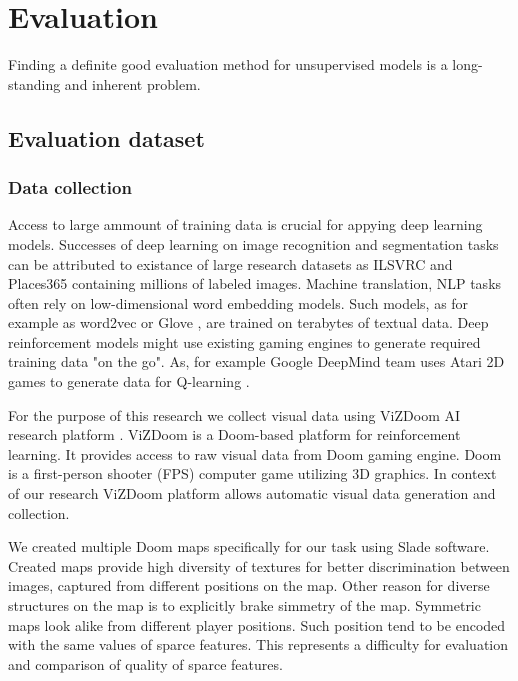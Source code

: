 
\chapter{Evaluation}
\label{ch:eval}

Finding a definite good evaluation method for unsupervised models is a long-standing and inherent problem.


\section{Evaluation dataset}
\subsection{Data collection}

Access to large ammount of training data is crucial for appying deep learning models.
Successes of deep learning on image recognition and segmentation tasks can be attributed to existance of large research datasets as ILSVRC and Places365 \cite{ILSVRC15, Zhou2016} containing millions of labeled images.
Machine translation, NLP tasks \cite{Karpathy2014, Kim2014} often rely on low-dimensional word embedding models.
Such models, as for example as word2vec or Glove \cite{Mikolov2013, pennington2014glove}, are trained on terabytes of textual data.
Deep reinforcement models might use existing gaming engines to generate required training data "on the go".
As, for example Google DeepMind team uses Atari 2D games to generate data for Q-learning \cite{Mnih2013}.

For the purpose of this research we collect visual data using ViZDoom AI research platform \cite{Kempka2016}.
ViZDoom is a Doom-based platform for reinforcement learning.
It provides access to raw visual data from Doom gaming engine.
Doom is a first-person shooter (FPS) computer game utilizing 3D graphics.
In context of our research ViZDoom platform allows automatic visual data generation and collection.

We created multiple Doom maps specifically for our task using Slade \cite{Slade3} software.
Created maps provide high diversity of textures for better discrimination between images, captured from different positions on the map.
Other reason for diverse structures on the map is to explicitly brake simmetry of the map.
Symmetric maps look alike from different player positions.
Such position tend to be encoded with the same values of sparce features.
This represents a difficulty for evaluation and comparison of quality of sparce features.

